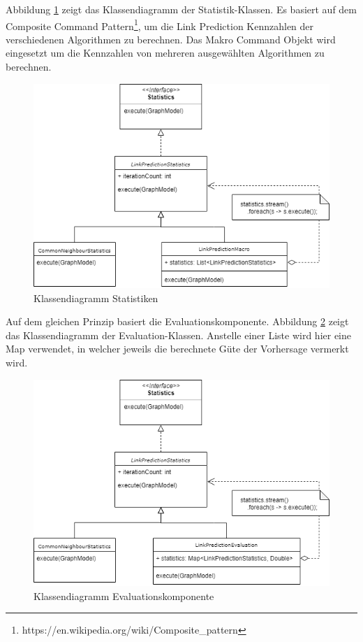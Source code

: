 Abbildung \ref{fig:class_statistic} zeigt das Klassendiagramm der Statistik-Klassen. Es basiert auf dem Composite Command Pattern\footnote{https://en.wikipedia.org/wiki/Composite_pattern}, um die Link Prediction Kennzahlen der verschiedenen Algorithmen zu berechnen. Das Makro Command Objekt wird eingesetzt um die Kennzahlen von mehreren ausgewählten Algorithmen zu berechnen.
\begin{figure}[h]
    \centering
    \includegraphics[width=\linewidth]{resources/class_Statistic.png}
    \caption{Klassendiagramm Statistiken}
    \label{fig:class_statistic}
\end{figure}

Auf dem gleichen Prinzip basiert die Evaluationskomponente. Abbildung \ref{fig:class_eval} zeigt das Klassendiagramm der Evaluation-Klassen. Anstelle einer Liste wird hier eine Map verwendet, in welcher jeweils die berechnete Güte der Vorhersage vermerkt wird.
\begin{figure}[h]
    \centering
    \includegraphics[width=\linewidth]{resources/class_Evaluation.png}
    \caption{Klassendiagramm Evaluationskomponente}
    \label{fig:class_eval}
\end{figure}

